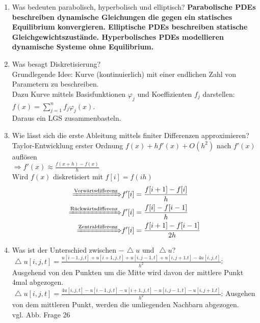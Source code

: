 \documentclass[10pt,a4paper,titlepage]{article}
\begin{document}
\begin{enumerate}[resume=b]
\begin{figure}[h]
	\end{figure}
	
	\item Was bedeuten parabolisch, hyperbolisch und elliptisch?\newline
	\textbf{Parabolische PDEs beschreiben dynamische Gleichungen die gegen ein statisches Equilibrium konvergieren. Elliptische PDEs beschreiben statische Gleichgewichtszustände. 
		Hyperbolisches PDEs modellieren dynamische Systeme ohne Equilibrium.}
	\item Was besagt Diskretisierung? \\
		Grundlegende Idee: Kurve (kontinuierlich) mit einer endlichen Zahl von Parametern zu beschreiben. \\
		Dazu Kurve mittels Basisfunktionen $\varphi_j$ und Koeffizienten $f_j$ darstellen: $f(x) = \sum_{j=1}^n f_j\varphi_j(x)$.\\
		Daraus ein LGS zusammenbasteln.
	\item Wie lässt sich die erste Ableitung mittels finiter Differenzen approximieren?\newline
	Taylor-Entwicklung erster Ordnung $f(x)+hf'(x)+O(h^2)$ nach $f'(x)$ auflösen\\
	$\Rightarrow f'(x)\approx \frac{f(x+h)-f(x)}{h}$\\
	Wird $f(x)$ diskretisiert mit $f[i]=f(ih)$
	\begin{align*}
	\xRightarrow{\text{Vorwärtsdifferenz}} &f'[i]=\frac{f[i+1]-f[i]}{h}\\
	\xRightarrow{\text{Rückwärtsdifferenz}} &f'[i]=\frac{f[i]-f[i-1]}{h}\\
	\xRightarrow{\text{Zentraldifferenz}} &f'[i]=\frac{f[i+1]-f[i-1]}{2h}
	\end{align*}
	\item Was ist der Unterschied zwischen $-\mathop{\!\mathbin\bigtriangleup} u$ und $\mathop{\!\mathbin\bigtriangleup} u$? \newline
	$\mathop{\!\mathbin\bigtriangleup} u[i,j,t]=\frac{u[i-1,j,t]+u[i+1,j,t]+u[i,j-1,t]+u[i,j+1.t]-4u[i,j,t]}{h^2}$: Ausgehend von den Punkten um die Mitte wird davon der mittlere Punkt 4mal abgezogen. \\
	$\mathop{\!\mathbin\bigtriangleup} u[i,j,t]=\frac{4u[i,j,t]-u[i-1,j,t]-u[i+1,j,t]-u[i,j-1,t]-u[i,j+1.t]}{h^2}$: Ausgehen von dem mittleren Punkt, werden die umliegenden Nachbarn abgezogen. \\
	vgl. Abb. Frage 26
\end{enumerate}
\end{document}
